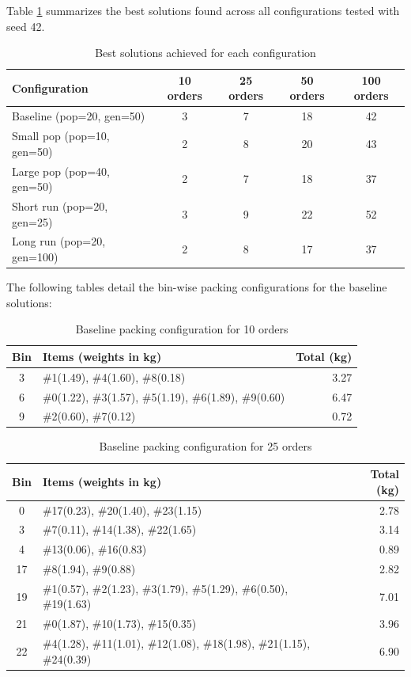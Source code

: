 \documentclass[journal,12pt,onecolumn]{IEEEtran}
\begin{document}
Table \ref{tab:best_solutions} summarizes the best solutions found across all configurations tested with seed 42.

\begin{table}[htbp]
\centering
\caption{Best solutions achieved for each configuration}
\label{tab:best_solutions}
\begin{tabular}{|l|c|c|c|c|}
\hline
\textbf{Configuration} & \textbf{10 orders} & \textbf{25 orders} & \textbf{50 orders} & \textbf{100 orders} \\
\hline
Baseline (pop=20, gen=50) & 3 & 7 & 18 & 42 \\
Small pop (pop=10, gen=50) & 2 & 8 & 20 & 43 \\
Large pop (pop=40, gen=50) & 2 & 7 & 18 & 37 \\
Short run (pop=20, gen=25) & 3 & 9 & 22 & 52 \\
Long run (pop=20, gen=100) & 2 & 8 & 17 & 37 \\
\hline
\end{tabular}
\end{table}

The following tables detail the bin-wise packing configurations for the baseline solutions:

\begin{table}[htbp]
\centering
\caption{Baseline packing configuration for 10 orders}
\label{tab:baseline10}
\begin{tabular}{|c|l|r|}
\hline
\textbf{Bin} & \textbf{Items (weights in kg)} & \textbf{Total (kg)} \\
\hline
3 & \#1(1.49), \#4(1.60), \#8(0.18) & 3.27 \\
\hline
6 & \#0(1.22), \#3(1.57), \#5(1.19), \#6(1.89), \#9(0.60) & 6.47 \\
\hline
9 & \#2(0.60), \#7(0.12) & 0.72 \\
\hline
\end{tabular}
\end{table}

\begin{table}[htbp]
\centering
\caption{Baseline packing configuration for 25 orders}
\label{tab:baseline25}
\begin{tabular}{|c|l|r|}
\hline
\textbf{Bin} & \textbf{Items (weights in kg)} & \textbf{Total (kg)} \\
\hline
0 & \#17(0.23), \#20(1.40), \#23(1.15) & 2.78 \\
\hline
3 & \#7(0.11), \#14(1.38), \#22(1.65) & 3.14 \\
\hline
4 & \#13(0.06), \#16(0.83) & 0.89 \\
\hline
17 & \#8(1.94), \#9(0.88) & 2.82 \\
\hline
19 & \#1(0.57), \#2(1.23), \#3(1.79), \#5(1.29), \#6(0.50), \#19(1.63) & 7.01 \\
\hline
21 & \#0(1.87), \#10(1.73), \#15(0.35) & 3.96 \\
\hline
22 & \#4(1.28), \#11(1.01), \#12(1.08), \#18(1.98), \#21(1.15), \#24(0.39) & 6.90 \\
\hline
\end{tabular}
\end{table}
\end{document}

